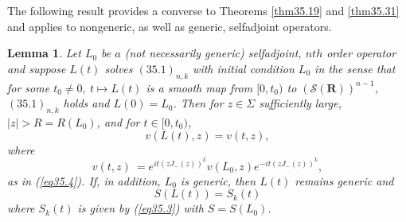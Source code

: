 \documentclass{surv-l}
\theoremstyle{plain}
\newtheorem{lemma}[theorem]{Lemma}
\theoremstyle{definition}
\numberwithin{equation}{chapter}
\begin{document}
The following result provides a converse to Theorems \ref{thm35.19} and \ref{thm35.31} and applies to nongeneric, as well as generic, selfadjoint operators.
\setcounter{theorem}{32}
\begin{lemma}\label{lem35.33}
Let $L_{0}$ be $a$ \emph{(}not necessarily generic\emph{)} selfadjoint, $nth$ order operator and suppose $L(t)$ solves $(35.1)_{n,k}$ with initial condition $L_{0}$ in the sense that for some $t_{0}\neq 0,\ t\mapsto L(t)$ is a smooth map from $[0, t_{0})$ to $(\mathscr{S}(\mathbf{R}))^{n-1}$, $(35.1)_{n,k}$ holds and $L(0)=L_{0}$. Then for $ z\in\Sigma$ sufficiently large, $|z|>R= R(L_{0})$, and for $t\in[0, t_{0})$,
\setcounter{equation}{33}
\begin{equation}\label{eq35.34}
v(L(t), z)=v(t, z),
\end{equation}
where
\begin{equation*}
v(t, z)\ =e^{it(zJ_{-}(z))^{k}}v(L_{0}, z)e^{-it(zJ_{-}(z))^{k}},
\end{equation*}
as in \emph{(\ref{eq35.4})}. If, in addition, $L_{0}$ is generic, then $L(t)$ remains generic and
\begin{equation}\label{eq35.35}
S(L(t))=S_{k}(t)
\end{equation}
where $S_{k}(t)$ is given by \emph{(\ref{eq35.3})} with $S=S(L_{0})$.
\end{lemma}
\end{document}

